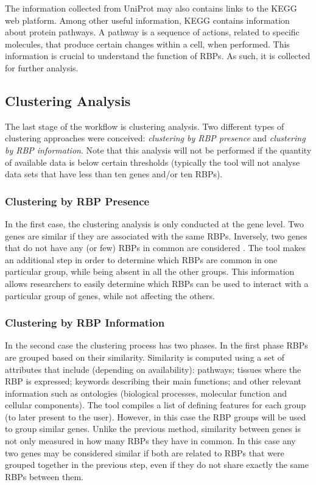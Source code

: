The information collected from UniProt may also contains links to the KEGG web
platform. Among other useful information, KEGG contains information about
protein pathways. A pathway is a sequence of actions, related to specific
molecules, that produce certain changes within a cell, when performed. This
information is crucial to understand the function of RBPs. As such, it is
collected for further analysis.

\subsection{Clustering Analysis}

The last stage of the workflow is clustering analysis. Two different types of
clustering approaches were conceived: \emph{clustering by RBP presence} and
\emph{clustering by RBP information}. Note that this analysis will not be
performed if the quantity of available data is below certain thresholds
(typically the tool will not analyse data sets that have less than ten genes
and/or ten RBPs).

\subsubsection*{Clustering by RBP Presence}

In the first case, the clustering analysis is only conducted at the gene level.
Two genes are similar if they are associated with the same RBPs. Inversely, two
genes that do not have any (or few) RBPs in common are considered . The
tool makes an additional step in order to determine which RBPs are common in one
particular group, while being absent in all the other groups. This information
allows researchers to easily determine which RBPs can be used to interact with a
particular group of genes, while not affecting the others.

\subsubsection*{Clustering by RBP Information}

In the second case the clustering process has two phases. In the first phase
RBPs are grouped based on their similarity. Similarity is computed using a set
of attributes that include (depending on availability): pathways; tissues where
the RBP is expressed; keywords describing their main functions; and other
relevant information such as ontologies (biological processes, molecular
function and cellular components). The tool compiles a list of defining features
for each group (to later present to the user). However, in this case the RBP
groups will be used to group similar genes. Unlike the previous method,
similarity between genes is not only measured in how many RBPs they have in
common. In this case any two genes may be considered similar if both are related
to RBPs that were grouped together in the previous step, even if they do not
share exactly the same RBPs between them.

